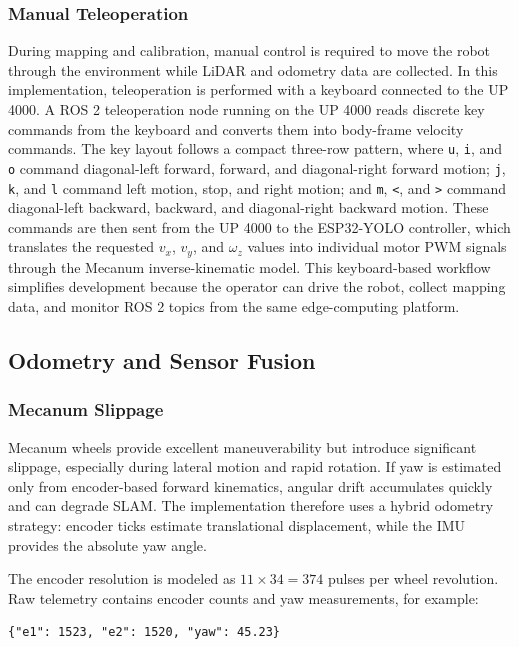 \documentclass{llncs}
\begin{document}
\subsubsection{Manual Teleoperation}
During mapping and calibration, manual control is required to move the robot through the environment while LiDAR and odometry data are collected. In this implementation, teleoperation is performed with a keyboard connected to the UP 4000. A ROS 2 teleoperation node running on the UP 4000 reads discrete key commands from the keyboard and converts them into body-frame velocity commands. The key layout follows a compact three-row pattern, where \texttt{u}, \texttt{i}, and \texttt{o} command diagonal-left forward, forward, and diagonal-right forward motion; \texttt{j}, \texttt{k}, and \texttt{l} command left motion, stop, and right motion; and \texttt{m}, \texttt{<}, and \texttt{>} command diagonal-left backward, backward, and diagonal-right backward motion. These commands are then sent from the UP 4000 to the ESP32-YOLO controller, which translates the requested $v_x$, $v_y$, and $\omega_z$ values into individual motor PWM signals through the Mecanum inverse-kinematic model. This keyboard-based workflow simplifies development because the operator can drive the robot, collect mapping data, and monitor ROS 2 topics from the same edge-computing platform.

\subsection{Odometry and Sensor Fusion}
\subsubsection{Mecanum Slippage}
Mecanum wheels provide excellent maneuverability but introduce significant slippage, especially during lateral motion and rapid rotation. If yaw is estimated only from encoder-based forward kinematics, angular drift accumulates quickly and can degrade SLAM. The implementation therefore uses a hybrid odometry strategy: encoder ticks estimate translational displacement, while the IMU provides the absolute yaw angle.

The encoder resolution is modeled as $11 \times 34 = 374$ pulses per wheel revolution. Raw telemetry contains encoder counts and yaw measurements, for example:

\begin{lstlisting}[language={},caption={Example MQTT telemetry payload.}]
{"e1": 1523, "e2": 1520, "yaw": 45.23}
\end{lstlisting}
\end{document}
